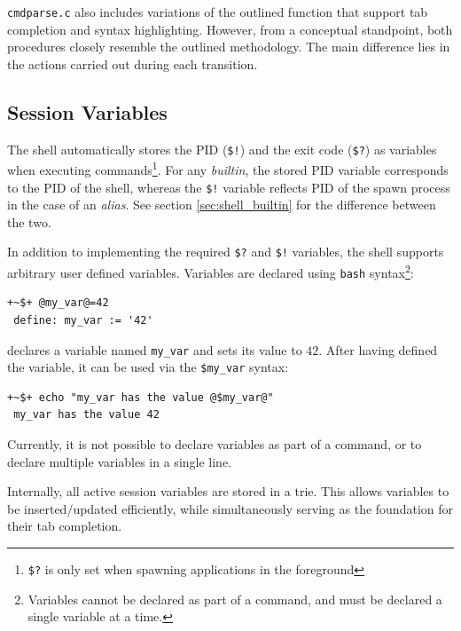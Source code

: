 \texttt{cmdparse.c}  also includes variations of the outlined function that support tab completion and syntax highlighting. However, from a conceptual standpoint, both procedures closely resemble the outlined methodology. The main difference lies in the actions carried out during each transition.

\subsection{Session Variables}\label{sec:shell_session_vars}

\newcommand{\ShellVar}[1]{{\color{shell_variable}\texttt{#1}}}

The shell automatically stores the PID (\ShellVar{\$!}) and the exit code (\ShellVar{\$?}) as variables when executing commands\footnote{\ShellVar{\$?} is only set when spawning applications in the foreground}. For any \emph{builtin}, the stored PID variable corresponds to the PID of the shell, whereas the \ShellVar{\$!} variable reflects PID of the spawn process in the case of an \emph{alias}. See section \ref{sec:shell_builtin} for the difference between the two.

In addition to implementing the required \ShellVar{\$?} and \ShellVar{\$!} variables, the shell supports arbitrary user defined variables. Variables are declared using \texttt{bash} syntax\footnote{Variables cannot be declared as part of a command, and must be declared a single variable at a time.}:

\begin{lstlisting}[style=ShellInputStyle]
 +~$+ @my_var@=42
 define: my_var := '42'
\end{lstlisting}

declares a variable named \texttt{my\_var} and sets its value to $42$. After having defined the variable, it can be used via the \ShellVar{\$my\_var} syntax:


\begin{lstlisting}[style=ShellInputStyle]
 +~$+ echo "my_var has the value @$my_var@"
 my_var has the value 42
\end{lstlisting}

Currently, it is not possible to declare variables as part of a command, or to declare multiple variables in a single line.

Internally, all active session variables are stored in a trie. This allows variables to be inserted/updated efficiently, while simultaneously serving as the foundation for their tab completion.

